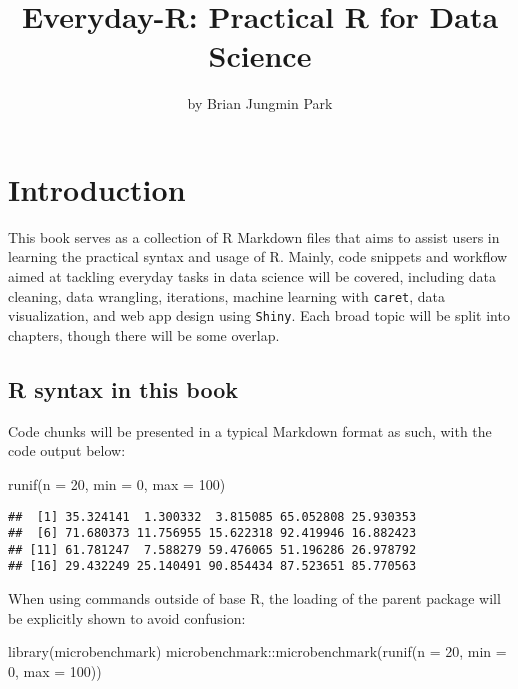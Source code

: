 \documentclass[
]{book}
\title{Everyday-R: Practical R for Data Science}
\author{by Brian Jungmin Park}
\date{}
\newenvironment{Shaded}{\begin{snugshade}}{\end{snugshade}}
\newcommand{\AttributeTok}[1]{\textcolor[rgb]{0.77,0.63,0.00}{#1}}
\newcommand{\DecValTok}[1]{\textcolor[rgb]{0.00,0.00,0.81}{#1}}
\newcommand{\FunctionTok}[1]{\textcolor[rgb]{0.00,0.00,0.00}{#1}}
\newcommand{\NormalTok}[1]{#1}
\newcommand{\SpecialCharTok}[1]{\textcolor[rgb]{0.00,0.00,0.00}{#1}}
\begin{document}
\maketitle

{
\setcounter{tocdepth}{1}
\tableofcontents
}
\hypertarget{introduction}{%
\chapter{Introduction}\label{introduction}}

This book serves as a collection of R Markdown files that aims to assist users in learning the practical syntax and usage of R. Mainly, code snippets and workflow aimed at tackling everyday tasks in data science will be covered, including data cleaning, data wrangling, iterations, machine learning with \texttt{caret}, data visualization, and web app design using \texttt{Shiny}. Each broad topic will be split into chapters, though there will be some overlap.

\hypertarget{r-syntax-in-this-book}{%
\section{R syntax in this book}\label{r-syntax-in-this-book}}

Code chunks will be presented in a typical Markdown format as such, with the code output below:

\begin{Shaded}
\begin{Highlighting}[]
\FunctionTok{runif}\NormalTok{(}\AttributeTok{n =} \DecValTok{20}\NormalTok{, }\AttributeTok{min =} \DecValTok{0}\NormalTok{, }\AttributeTok{max =} \DecValTok{100}\NormalTok{)}
\end{Highlighting}
\end{Shaded}

\begin{verbatim}
##  [1] 35.324141  1.300332  3.815085 65.052808 25.930353
##  [6] 71.680373 11.756955 15.622318 92.419946 16.882423
## [11] 61.781247  7.588279 59.476065 51.196286 26.978792
## [16] 29.432249 25.140491 90.854434 87.523651 85.770563
\end{verbatim}

When using commands outside of base R, the loading of the parent package will be explicitly shown to avoid confusion:

\begin{Shaded}
\begin{Highlighting}[]
\FunctionTok{library}\NormalTok{(microbenchmark)}
\NormalTok{microbenchmark}\SpecialCharTok{::}\FunctionTok{microbenchmark}\NormalTok{(}\FunctionTok{runif}\NormalTok{(}\AttributeTok{n =} \DecValTok{20}\NormalTok{, }\AttributeTok{min =} \DecValTok{0}\NormalTok{, }\AttributeTok{max =} \DecValTok{100}\NormalTok{))}
\end{Highlighting}
\end{Shaded}
\end{document}

